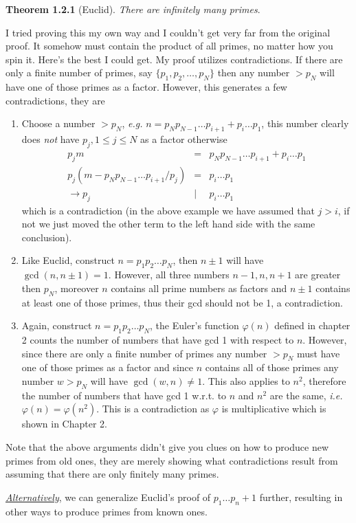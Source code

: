 \documentclass[aps,preprint,preprintnumbers,nofootinbib,showpacs,prd]{revtex4-1}
\newcommand{\ie}{{\it i.e.} }
\newcommand{\eg}{{\it e.g.} }
\newcommand{\nbea}{\begin{eqnarray*}}
\newcommand{\neea}{\end{eqnarray*}}
\begin{document}
{\bf Theorem 1.2.1} (Euclid). {\it There are infinitely many primes}.

I tried proving this my own way and I couldn't get very far from the original proof. It somehow must contain the product of all primes, no matter how you spin it. Here's the best I could get. My proof utilizes contradictions. If there are only a finite number of primes, say $\{p_1, p_2, \dots, p_N\}$ then any number $> p_N$ will have one of  those primes as a factor. However, this generates a few contradictions, they are
%
\begin{enumerate}
\item Choose a number $> p_N$, \eg $n = p_N p_{N-1} \dots p_{i+1} + p_i \dots p_1$, this number clearly does {\it not} have $p_j, 1 \le j \le N$ as a factor otherwise
%
\nbea
p_j m & = & p_N p_{N-1} \dots p_{i+1} + p_i \dots p_1 \\
p_j (m - p_N p_{N-1} \dots p_{i+1}/ p_j) & = & p_i \dots p_1 \\
\to p_j & | & p_i \dots p_1
\neea
%
which is a contradiction (in the above example we have assumed that $j > i$, if not we just moved the other term to the left hand side with the same conclusion).
%
\item Like Euclid, construct $n = p_1 p_2 \dots p_N$, then $n \pm 1$ will have $\gcd(n, n\pm 1) = 1$. However, all three numbers $n-1, n, n+1$ are greater then $p_N$, moreover $n$ contains all prime numbers as factors and $n \pm 1$ contains at least one of those primes, thus their gcd should not be 1, a contradiction.
%
\item Again, construct $n = p_1 p_2 \dots p_N$, the Euler's function $\varphi(n)$ defined in chapter 2 counts the number of numbers that have gcd 1 with respect to $n$. However, since there are only a finite number of primes any number $> p_N$ must have one of those primes as a factor and since $n$ contains all of those primes any number $w > p_N$ will have $\gcd(w, n) \neq 1$. This also applies to $n^2$, therefore the number of numbers that have gcd 1 w.r.t. to $n$ and $n^2$ are the same, \ie $\varphi(n) = \varphi(n^2)$. This is a contradiction as $\varphi$ is multiplicative which is shown in Chapter 2.  
\end{enumerate}
Note that the above arguments didn't give you clues on how to produce new primes from old ones, they are merely showing what contradictions result from assuming that there are only finitely many primes.

\underline {\textit{Alternatively}}, we can generalize Euclid's proof of $p_1 \dots p_n + 1$ further, resulting in other ways to produce primes from known ones.
\end{document}
